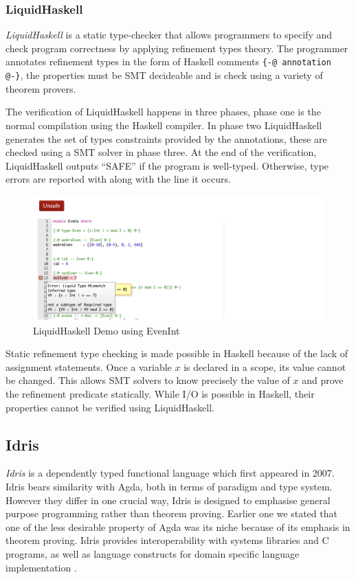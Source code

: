 \documentclass[a4paper,12pt]{report}
\begin{document}
\subsubsection{LiquidHaskell}
\textit{LiquidHaskell} \cite{liquidHaskell} 
is a static type-checker that allows programmers to specify and 
check program correctness by applying refinement types theory. The programmer 
annotates refinement types in the form of Haskell comments 
\verb|{-@ annotation @-}|, the properties must be SMT decideable and is check 
using a variety of theorem provers. 

\par
The verification of LiquidHaskell happens in three phases, phase one is the 
normal compilation using the Haskell compiler. In phase two LiquidHaskell 
generates the set of types constraints provided by the annotations, these are 
checked using a SMT solver in phase three. At the end of the verification, 
LiquidHaskell outputs ``SAFE'' if the program is well-typed. Otherwise, 
type errors are reported with along with the line it occurs. 

\begin{figure}[H] 
  \begin{center}
    \includegraphics[scale=0.5]{assets/lh_demo_sm.PNG}
  \end{center}
  \caption{LiquidHaskell Demo using EvenInt}
  \label{fig:lh_demo}
\end{figure}

\par
Static refinement type checking is made possible in Haskell because of the lack 
of assignment statements. Once a variable $x$ is declared in a scope, its value 
cannot be changed. This allows SMT solvers to know precisely the value of $x$ 
and prove the refinement predicate statically. While I/O is possible in 
Haskell, their properties cannot be verified using LiquidHaskell.

\subsection{Idris}
\textit{Idris} \cite{idris} is a dependently typed functional language which first 
appeared in 2007. Idris bears similarity with Agda, both in terms of paradigm 
and type system. However they differ in one crucial way, Idris is designed to 
emphasise general purpose programming rather than theorem proving. Earlier one 
we stated that one of the less desirable property of Agda was its niche because 
of its emphasis in theorem proving. Idris provides 
interoperability with systems libraries and C programs, 
as well as language constructs for domain specific language 
implementation \cite{gpIdris}. 
\end{document}
